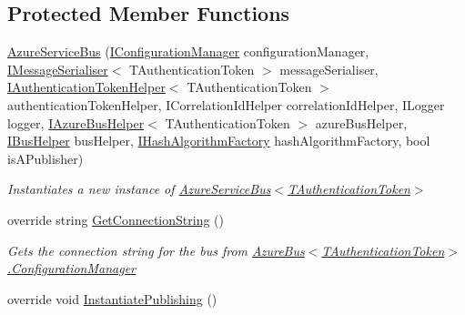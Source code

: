 \subsection*{Protected Member Functions}
\begin{DoxyCompactItemize}
\item 
\hyperlink{classCqrs_1_1Azure_1_1ServiceBus_1_1AzureServiceBus_a09e34bafdb96fb8136efa428df9f80b2_a09e34bafdb96fb8136efa428df9f80b2}{Azure\+Service\+Bus} (\hyperlink{interfaceCqrs_1_1Configuration_1_1IConfigurationManager}{I\+Configuration\+Manager} configuration\+Manager, \hyperlink{interfaceCqrs_1_1Azure_1_1ServiceBus_1_1IMessageSerialiser}{I\+Message\+Serialiser}$<$ T\+Authentication\+Token $>$ message\+Serialiser, \hyperlink{interfaceCqrs_1_1Authentication_1_1IAuthenticationTokenHelper}{I\+Authentication\+Token\+Helper}$<$ T\+Authentication\+Token $>$ authentication\+Token\+Helper, I\+Correlation\+Id\+Helper correlation\+Id\+Helper, I\+Logger logger, \hyperlink{interfaceCqrs_1_1Azure_1_1ServiceBus_1_1IAzureBusHelper}{I\+Azure\+Bus\+Helper}$<$ T\+Authentication\+Token $>$ azure\+Bus\+Helper, \hyperlink{interfaceCqrs_1_1Bus_1_1IBusHelper}{I\+Bus\+Helper} bus\+Helper, \hyperlink{interfaceCqrs_1_1Bus_1_1IHashAlgorithmFactory}{I\+Hash\+Algorithm\+Factory} hash\+Algorithm\+Factory, bool is\+A\+Publisher)
\begin{DoxyCompactList}\small\item\em Instantiates a new instance of \hyperlink{classCqrs_1_1Azure_1_1ServiceBus_1_1AzureServiceBus_a09e34bafdb96fb8136efa428df9f80b2_a09e34bafdb96fb8136efa428df9f80b2}{Azure\+Service\+Bus$<$\+T\+Authentication\+Token$>$} \end{DoxyCompactList}\item 
override string \hyperlink{classCqrs_1_1Azure_1_1ServiceBus_1_1AzureServiceBus_a5a3b3610dc5dfebe586262c0bc787748_a5a3b3610dc5dfebe586262c0bc787748}{Get\+Connection\+String} ()
\begin{DoxyCompactList}\small\item\em Gets the connection string for the bus from \hyperlink{classCqrs_1_1Azure_1_1ServiceBus_1_1AzureBus_aaf9469d220fb23cb0521fa76b25ab228_aaf9469d220fb23cb0521fa76b25ab228}{Azure\+Bus$<$\+T\+Authentication\+Token$>$.\+Configuration\+Manager} \end{DoxyCompactList}\item 
override void \hyperlink{classCqrs_1_1Azure_1_1ServiceBus_1_1AzureServiceBus_a5c286d29b0bbfe3770f3407efda57036_a5c286d29b0bbfe3770f3407efda57036}{Instantiate\+Publishing} ()

\end{DoxyCompactItemize}
